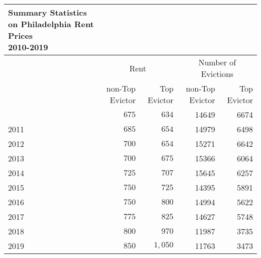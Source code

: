 \begin{longtable}{l|rrrr}
\caption*{
{\large Summary Statistics on Philadelphia Rent Prices} \\ 
{\small 2010-2019}
} \\ 
\toprule
\multicolumn{1}{l}{} & \multicolumn{2}{c}{Rent} & \multicolumn{2}{c}{Number of Evictions} \\ 
\cmidrule(lr){2-3} \cmidrule(lr){4-5}
\multicolumn{1}{l}{} & non-Top Evictor & Top Evictor & non-Top Evictor & Top Evictor \\ 
\midrule\addlinespace[2.5pt]
2010 & $675$ & $634$ & 14649 & 6674 \\ 
2011 & $685$ & $654$ & 14979 & 6498 \\ 
2012 & $700$ & $654$ & 15271 & 6642 \\ 
2013 & $700$ & $675$ & 15366 & 6064 \\ 
2014 & $725$ & $707$ & 15645 & 6257 \\ 
2015 & $750$ & $725$ & 14395 & 5891 \\ 
2016 & $750$ & $800$ & 14994 & 5622 \\ 
2017 & $775$ & $825$ & 14627 & 5748 \\ 
2018 & $800$ & $970$ & 11987 & 3735 \\ 
2019 & $850$ & $1,050$ & 11763 & 3473 \\ 
\bottomrule
\end{longtable}

